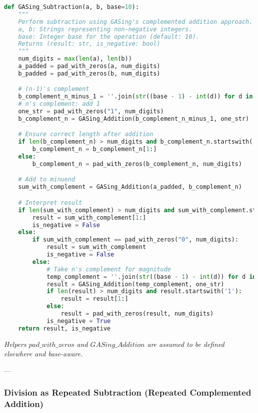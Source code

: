 \begin{lstlisting}[language=Python,caption={GASing\_Subtraction Algorithm}]
def GASing_Subtraction(a, b, base=10):
    """
    Perform subtraction using GASing's complemented addition approach.
    a, b: Strings representing non-negative integers.
    base: Integer base for the operation (default: 10).
    Returns (result: str, is_negative: bool)
    """
    num_digits = max(len(a), len(b))
    a_padded = pad_with_zeros(a, num_digits)
    b_padded = pad_with_zeros(b, num_digits)

    # (n-1)'s complement
    b_complement_n_minus_1 = ''.join(str((base - 1) - int(d)) for d in b_padded)
    # n's complement: add 1
    one_str = pad_with_zeros("1", num_digits)
    b_complement_n = GASing_Addition(b_complement_n_minus_1, one_str)

    # Ensure correct length after addition
    if len(b_complement_n) > num_digits and b_complement_n.startswith('1'):
        b_complement_n = b_complement_n[1:]
    else:
        b_complement_n = pad_with_zeros(b_complement_n, num_digits)

    # Add to minuend
    sum_with_complement = GASing_Addition(a_padded, b_complement_n)

    # Interpret result
    if len(sum_with_complement) > num_digits and sum_with_complement.startswith('1'):
        result = sum_with_complement[1:]
        is_negative = False
    else:
        if sum_with_complement == pad_with_zeros("0", num_digits):
            result = sum_with_complement
            is_negative = False
        else:
            # Take n's complement for magnitude
            temp_complement = ''.join(str((base - 1) - int(d)) for d in pad_with_zeros(sum_with_complement, num_digits))
            result = GASing_Addition(temp_complement, one_str)
            if len(result) > num_digits and result.startswith('1'):
                result = result[1:]
            else:
                result = pad_with_zeros(result, num_digits)
            is_negative = True
    return result, is_negative
\end{lstlisting}

\emph{Helpers \texttt{$pad\_with\_{zeros}$} and \texttt{$GASing\_{Addition}$} are assumed to be defined elsewhere and base-aware.}

---
\subsubsection{Division as Repeated Subtraction (Repeated Complemented Addition)}

